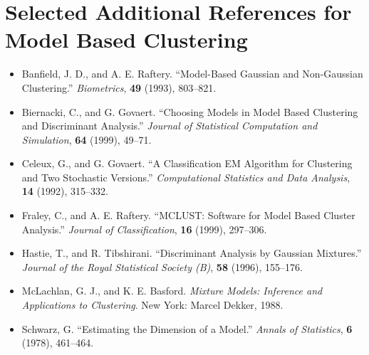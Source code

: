 \section*{Selected Additional References for Model Based Clustering}
\label{sec:12.10}

\begin{itemize}
\item[] Banfield, J. D., and A. E. Raftery. “Model-Based Gaussian and Non-Gaussian Clustering.” \textit{Biometrics}, \textbf{49} (1993), 803--821.
\item[] Biernacki, C., and G. Govaert. “Choosing Models in Model Based Clustering and Discriminant Analysis.” \textit{Journal of Statistical Computation and Simulation}, \textbf{64} (1999), 49--71.
\item[] Celeux, G., and G. Govaert. “A Classification EM Algorithm for Clustering and Two Stochastic Versions.” \textit{Computational Statistics and Data Analysis}, \textbf{14} (1992), 315--332.
\item[] Fraley, C., and A. E. Raftery. “MCLUST: Software for Model Based Cluster Analysis.” \textit{Journal of Classification}, \textbf{16} (1999), 297--306.
\item[] Hastie, T., and R. Tibshirani. “Discriminant Analysis by Gaussian Mixtures.” \textit{Journal of the Royal Statistical Society (B)}, \textbf{58} (1996), 155--176.
\item[] McLachlan, G. J., and K. E. Basford. \textit{Mixture Models: Inference and Applications to Clustering}. New York: Marcel Dekker, 1988.
\item[] Schwarz, G. “Estimating the Dimension of a Model.” \textit{Annals of Statistics}, \textbf{6} (1978), 461--464.
\end{itemize}
